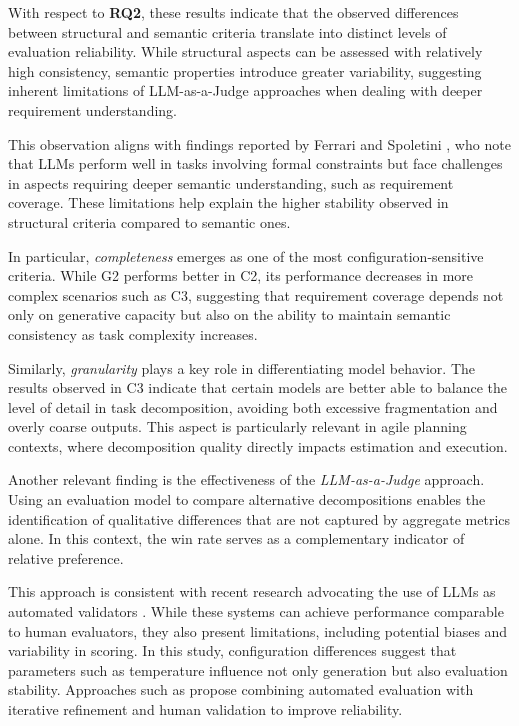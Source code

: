 \documentclass[pdflatex,sn-mathphys-num]{sn-jnl}
\theoremstyle{thmstyleone}%
\theoremstyle{thmstyletwo}%
\theoremstyle{thmstylethree}%
\begin{document}
With respect to \textbf{RQ2}, these results indicate that the observed differences between structural and semantic criteria translate into distinct levels of evaluation reliability. While structural aspects can be assessed with relatively high consistency, semantic properties introduce greater variability, suggesting inherent limitations of LLM-as-a-Judge approaches when dealing with deeper requirement understanding.

This observation aligns with findings reported by Ferrari and Spoletini \cite{proci2025}, who note that LLMs perform well in tasks involving formal constraints but face challenges in aspects requiring deeper semantic understanding, such as requirement coverage. These limitations help explain the higher stability observed in structural criteria compared to semantic ones.

In particular, \textit{completeness} emerges as one of the most configuration-sensitive criteria. While G2 performs better in C2, its performance decreases in more complex scenarios such as C3, suggesting that requirement coverage depends not only on generative capacity but also on the ability to maintain semantic consistency as task complexity increases.

Similarly, \textit{granularity} plays a key role in differentiating model behavior. The results observed in C3 indicate that certain models are better able to balance the level of detail in task decomposition, avoiding both excessive fragmentation and overly coarse outputs. This aspect is particularly relevant in agile planning contexts, where decomposition quality directly impacts estimation and execution.

Another relevant finding is the effectiveness of the \textit{LLM-as-a-Judge} approach. Using an evaluation model to compare alternative decompositions enables the identification of qualitative differences that are not captured by aggregate metrics alone. In this context, the win rate serves as a complementary indicator of relative preference.

This approach is consistent with recent research advocating the use of LLMs as automated validators \cite{eigler2026}. While these systems can achieve performance comparable to human evaluators, they also present limitations, including potential biases and variability in scoring. In this study, configuration differences suggest that parameters such as temperature influence not only generation but also evaluation stability. Approaches such as \cite{daly2025} propose combining automated evaluation with iterative refinement and human validation to improve reliability.
\end{document}
